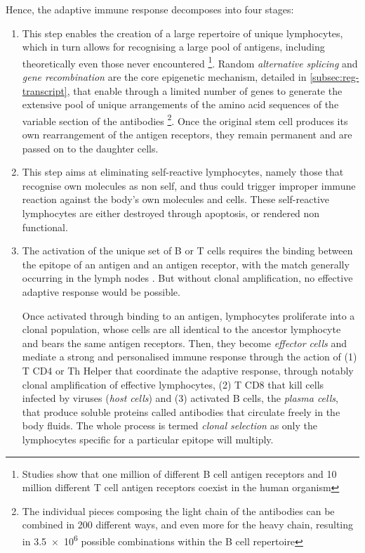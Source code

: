 Hence, the adaptive immune response decomposes into four stages:
\begin{enumerate}[label=(\alph*)]
    \item[cell diversity] This step enables the creation of a large repertoire of unique lymphocytes, which in turn allows for recognising a large pool of antigens, including theoretically even those never encountered \footnote{Studies show that one million of different B cell antigen
receptors and 10 million different T cell antigen receptors coexist in the human organism}. Random \textit{alternative splicing} and \textit{gene recombination} are the core epigenetic mechanism, detailed in \ref{subsec:reg-transcript}, that enable through a limited number of genes to generate the extensive pool of unique arrangements of the amino acid sequences of the variable section of the antibodies \footnote{The individual pieces composing the light chain of the antibodies can be combined in 200 different ways, and even more for the heavy chain, resulting in \num{3.5e6} possible combinations within the B cell repertoire}. Once the original stem cell produces its own rearrangement of the antigen receptors, they remain permanent and are passed on to the daughter cells.
    
    \item[Self-tolerance] This step aims at eliminating self-reactive lymphocytes, namely those that recognise own molecules as non self, and thus could trigger improper immune reaction against the body's own molecules and cells. These self-reactive lymphocytes are either destroyed through apoptosis, or rendered non functional. 

    \item[Clonal selection and Cell Proliferation] The activation of the unique set of B or T cells requires the binding between the epitope of an antigen and an antigen receptor, with the match generally occurring in the lymph nodes \autocite[Figure 6, Chapter 43]{campbell_etal20}. But without clonal amplification, no effective adaptive response would be possible. 
    
    Once activated through binding to an antigen, lymphocytes proliferate into a clonal population, whose cells are all identical to the ancestor lymphocyte and bears the same antigen receptors. Then,  they become \textit{effector cells} and mediate a strong and personalised immune response through the action of (1) T CD4 or Th Helper that coordinate the adaptive response, through notably clonal amplification of effective lymphocytes, (2) T CD8 that kill cells infected
by viruses (\textit{host cells}) and (3) activated B cells, the \textit{plasma cells}, that produce soluble proteins called antibodies that circulate freely in the body fluids. The whole process is termed \textit{clonal selection} as only the lymphocytes specific for a particular epitope will multiply. 


\end{enumerate}
